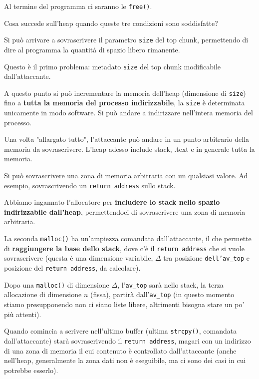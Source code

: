 Al termine del programma ci saranno le \texttt{free()}.

Cosa succede sull'heap quando queste tre condizioni sono soddisfatte?
\begin{center}
    
\end{center}

Si può arrivare a sovrascrivere il parametro \texttt{size} del top chunk, permettendo di dire al programma la quantità di spazio libero rimanente.

Questo è il primo problema: metadato \texttt{size} del top chunk modificabile dall'attaccante. 

A questo punto si può incrementare la memoria dell'heap (dimensione di \texttt{size}) fino a \textbf{tutta la memoria del processo indirizzabile}, la \texttt{size} è determinata unicamente in modo software. Si può andare a indirizzare nell'intera memoria del processo.

Una volta "allargato tutto", l'attaccante può andare in un punto arbitrario della memoria da sovrascrivere. L'heap adesso include stack, .text e in generale tutta la memoria. 

Si può sovrascrivere una zona di memoria arbitraria con un qualsiasi valore. Ad esempio, sovrascrivendo un \texttt{return address} sullo stack.

Abbiamo ingannato l'allocatore per \textbf{includere lo stack nello spazio indirizzabile dall'heap}, permettendoci di sovrascrivere una zona di memoria arbitraria.

La seconda \texttt{malloc()} ha un'ampiezza comandata dall'attaccante, il che permette di \textbf{raggiungere la base dello stack}, dove c'è il \texttt{return address} che si vuole sovrascrivere (questa è una dimensione variabile, $\Delta$ tra posizione \texttt{dell'av\_top} e posizione del \texttt{return address}, da calcolare).

Dopo una \texttt{malloc()} di dimensione $\Delta$, l'\texttt{av\_top} sarà nello stack, la terza allocazione di dimensione $n$ (fissa), partirà dall'\texttt{av\_top} (in questo momento stiamo presupponendo non ci siano liste libere, altrimenti bisogna stare un po' più attenti).

Quando comincia a scrivere nell'ultimo buffer (ultima \texttt{strcpy()}, comandata dall'attaccante) starà sovrascrivendo il \texttt{return address}, magari con un indirizzo di una zona di memoria il cui contenuto è controllato dall'attaccante (anche nell'heap, generalmente la zona dati non è eseguibile, ma ci sono dei casi in cui potrebbe esserlo).


